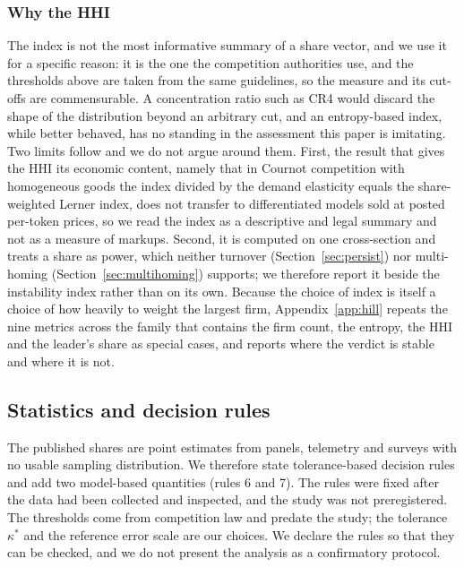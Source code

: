 \documentclass[11pt]{article}
\begin{document}
\subsubsection{Why the HHI} The index is not the most informative summary of a share vector, and we use it for a specific reason: it is the one the competition authorities use, and the thresholds above are taken from the same guidelines, so the measure and its cut-offs are commensurable. A concentration ratio such as CR4 would discard the shape of the distribution beyond an arbitrary cut, and an entropy-based index, while better behaved, has no standing in the assessment this paper is imitating. Two limits follow and we do not argue around them. First, the result that gives the HHI its economic content, namely that in Cournot competition with homogeneous goods the index divided by the demand elasticity equals the share-weighted Lerner index, does not transfer to differentiated models sold at posted per-token prices, so we read the index as a descriptive and legal summary and not as a measure of markups. Second, it is computed on one cross-section and treats a share as power, which neither turnover (Section~\ref{sec:persist}) nor multi-homing (Section~\ref{sec:multihoming}) supports; we therefore report it beside the instability index rather than on its own. Because the choice of index is itself a choice of how heavily to weight the largest firm, Appendix~\ref{app:hill} repeats the nine metrics across the family that contains the firm count, the entropy, the HHI and the leader's share as special cases, and reports where the verdict is stable and where it is not.

\subsection{Statistics and decision rules}
\label{sec:rules}

The published shares are point estimates from panels, telemetry and surveys with no usable sampling distribution. We therefore state tolerance-based decision rules and add two model-based quantities (rules 6 and 7). The rules were fixed after the data had been collected and inspected, and the study was not preregistered. The thresholds come from competition law and predate the study; the tolerance $\kappa^{*}$ and the reference error scale are our choices. We declare the rules so that they can be checked, and we do not present the analysis as a confirmatory protocol.
\end{document}
